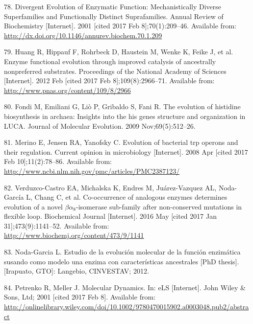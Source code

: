 \documentclass[12pt,twoside]{reedthesis}
\begin{document}
  \hypertarget{ref-gerlt_divergent_2001}{}
  78. Divergent Evolution of Enzymatic Function: Mechanistically Diverse
  Superfamilies and Functionally Distinct Suprafamilies. Annual Review of
  Biochemistry {[}Internet{]}. 2001 {[}cited 2017 Feb 8{]};70(1):209--46.
  Available from: \url{http://dx.doi.org/10.1146/annurev.biochem.70.1.209}
  
  \hypertarget{ref-huang_enzyme_2012}{}
  79. Huang R, Hippauf F, Rohrbeck D, Haustein M, Wenke K, Feike J, et al.
  Enzyme functional evolution through improved catalysis of ancestrally
  nonpreferred substrates. Proceedings of the National Academy of Sciences
  {[}Internet{]}. 2012 Feb {[}cited 2017 Feb 8{]};109(8):2966--71.
  Available from: \url{http://www.pnas.org/content/109/8/2966}
  
  \hypertarget{ref-fondi_evolution_2009}{}
  80. Fondi M, Emiliani G, Liò P, Gribaldo S, Fani R. The evolution of
  histidine biosynthesis in archaea: Insights into the his genes structure
  and organization in LUCA. Journal of Molecular Evolution. 2009
  Nov;69(5):512--26.
  
  \hypertarget{ref-merino_evolution_2008}{}
  81. Merino E, Jensen RA, Yanofsky C. Evolution of bacterial trp operons
  and their regulation. Current opinion in microbiology {[}Internet{]}.
  2008 Apr {[}cited 2017 Feb 10{]};11(2):78--86. Available from:
  \url{http://www.ncbi.nlm.nih.gov/pmc/articles/PMC2387123/}
  
  \hypertarget{ref-verduzco-castro_co-occurrence_2016}{}
  82. Verduzco-Castro EA, Michalska K, Endres M, Juárez-Vazquez AL,
  Noda-García L, Chang C, et al. Co-occurrence of analogous enzymes
  determines evolution of a novel \(\beta\alpha_8\)-isomerase sub-family
  after non-conserved mutations in flexible loop. Biochemical Journal
  {[}Internet{]}. 2016 May {[}cited 2017 Jan 31{]};473(9):1141--52.
  Available from: \url{http://www.biochemj.org/content/473/9/1141}
  
  \hypertarget{ref-noda_estudio_2012}{}
  83. Noda-Garcia L. Estudio de la evolución molecular de la función
  enzimática susando como modelo una enzima con características
  ancestrales {[}PhD thesis{]}. {[}Irapuato, GTO{]}: Langebio, CINVESTAV;
  2012.
  
  \hypertarget{ref-petrenko_molecular_2001}{}
  84. Petrenko R, Meller J. Molecular Dynamics. In: eLS {[}Internet{]}.
  John Wiley \& Sons, Ltd; 2001 {[}cited 2017 Feb 8{]}. Available from:
  \url{http://onlinelibrary.wiley.com/doi/10.1002/9780470015902.a0003048.pub2/abstract}
  
\end{document}
